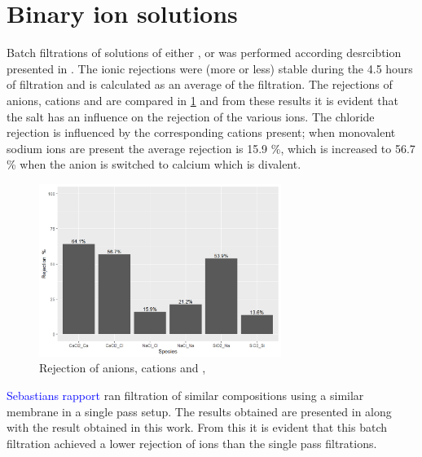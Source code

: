 \section{Binary ion solutions}
Batch filtrations of solutions of either ,  or  was performed according desrcibtion presented in . 
The ionic rejections were (more or less) stable during the 4.5 hours of filtration and is calculated as an average of the filtration.
The rejections of anions, cations and  are compared in \cref{fig:single_salt_avg_rejecion_comparison_bar} and from these results it is evident that the salt has an influence on the rejection of the various ions. 
The chloride rejection is influenced by the corresponding cations present; when monovalent sodium ions are present the average rejection is  15.9 \%, which is increased to 56.7 \% when the anion is switched to calcium which is divalent.

\begin{figure}[htbp]
    \centering
    \includegraphics[width=0.7\textwidth]{Billeder/data/single_salt/rejection_singlesalt_barplot.png}
    \caption{Rejection of anions, cations and , }
    \label{fig:single_salt_avg_rejecion_comparison_bar}
\end{figure}

\textcolor{blue}{Sebastians rapport} ran filtration of similar compositions using a similar membrane in a single pass setup.
The results obtained are presented in  along with the result obtained in this work.
From this it is evident that this batch filtration achieved a lower rejection of ions than the single pass filtrations.


